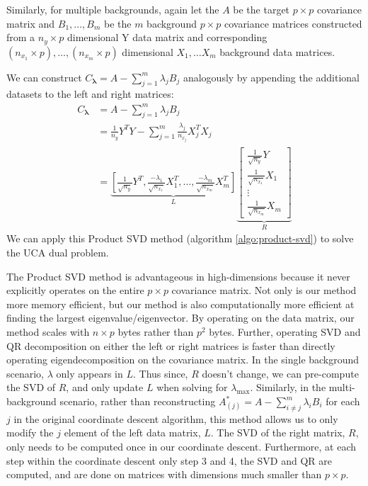 \documentclass[10pt]{article}
\begin{document}
Similarly, for multiple backgrounds, again let the $A$ be the target $p \times p$ covariance matrix and $ B_1, \ldots, B_m$ be the $m$ background $p \times p$ covariance matrices constructed from a $n_y \times p$ dimensional Y data matrix and corresponding $(n_{x_1} \times p), \ldots, (n_{x_m}\times p)$ dimensional $X_1, \ldots X_m$ background data matrices.

We can construct $C_{\boldsymbol{\lambda}} = A - \sum^{m}_{j=1}\lambda_jB_j$ analogously by appending the additional datasets to the left and right matrices:
\begin{align}
    C_{\boldsymbol{\lambda}}&= A - \sum^{m}_{j=1}\lambda_jB_j \nonumber \\
                                  &=\frac{1}{n_y}Y^{T}Y -\sum_{j=1}^{m}{\frac{\lambda_{j}}{n_{x_j}}X_{j}^TX_{j}} \nonumber\\
                                  &=  \underbrace{\left[\frac{1}{\sqrt{n_y}}Y^T, \frac{-\lambda_1}{\sqrt{n_{x_{1}}}} X^T_1, \ldots, \frac{-\lambda_m}{\sqrt{n_{x_{m}}}}X^T_m\right]}_{L} \underbrace{\begin{bmatrix} \frac{1}{\sqrt{n_{y}}}Y \\ \frac{1}{\sqrt{n_{x_{1}}}}X_1 \\ \vdots \\ \frac{1}{\sqrt{n_{x_{m}}}}X_m \end{bmatrix}}_{R} \label{eq:8}
\end{align}
We can apply this Product SVD method (algorithm \ref{algo:product-svd}) to solve the UCA dual problem.

The Product SVD method is advantageous in high-dimensions because it never explicitly operates on the entire $p \times p$ covariance matrix. 
Not only is our method more memory efficient, but our method is also computationally more efficient at finding the largest eigenvalue/eigenvector. By operating on the data matrix, our method scales with $n\times p$ bytes rather than $p^2$ bytes. Further, operating SVD and QR decomposition on either the left or right matrices is faster than directly operating eigendecomposition on the covariance matrix. In the single background scenario,  $\lambda$ only appears in $L$. Thus since, $R$ doesn't change, we can pre-compute the SVD of $R$, and only update $L$ when solving for $\lambda_{\text{max}}$.
Similarly, in the multi-background scenario, rather than reconstructing $A^{*}_{(j)} = A-\sum^{m}_{i\neq j}\lambda_i B_i$ for each $j$ in the original coordinate descent algorithm, this method allows us to only modify the $j$ element of the left data matrix, $L$.
The SVD of the right matrix, $R$, only needs to be computed once in our coordinate descent. Furthermore, at each step within the coordinate descent only step 3 and 4, the SVD and QR are computed, and are done on matrices with dimensions much smaller than $p \times p$.
\end{document}
